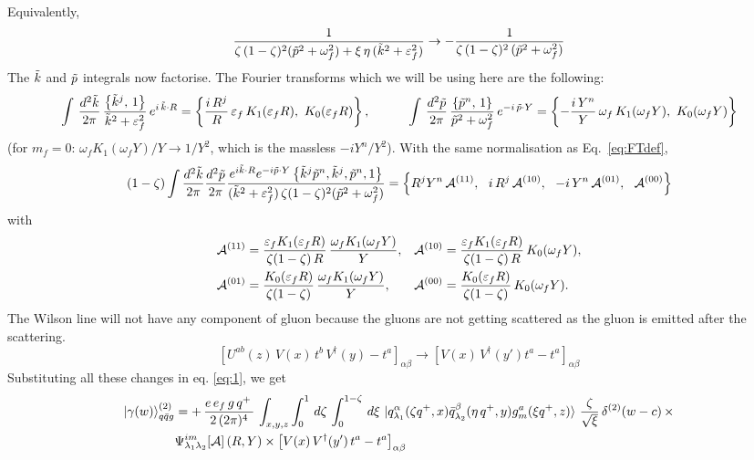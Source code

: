 \documentclass[9pt]{article}
\newcommand{\eps}{\varepsilon_{f}}           %
\newcommand{\om}{\omega_{f}}                 %
\newcommand{\Ga}[1]{\mathcal{A}^{(#1)}}      %
\numberwithin{equation}{section}
\begin{document}
\begin{enumerate}
Equivalently,
$$\frac{1}{\zeta\,(1-\zeta)^{2}(\Tilde{p}^{2}+\om^{2})+\xi\,\eta\, (\Tilde{k}^{2}+\eps^{2})}\rightarrow -\frac{1}{\zeta\,(1-\zeta)^{2}\,(\Tilde{p}^{2}+\om^{2})}$$
The $\Tilde{k}$ and $\Tilde{p}$ integrals now factorise. The Fourier transforms which we will be using here are the following:
$$\int\, \frac{d^{2}\Tilde{k}}{2\pi}\, \frac{\left\{\Tilde{k}^{j},\,1\right\}}{\Tilde{k}^{2}+\eps^{2}}\, e^{i\,\Tilde{k}\cdot R} = \left\{\frac{i\,R^{j}}{R}\,\eps\,K_{1}(\eps R),\ K_{0}(\eps R)\right\},\hspace{3em} \int\, \frac{d^{2}\Tilde{p}}{2\pi}\, \frac{\left\{\Tilde{p}^{n},\,1\right\}}{\Tilde{p}^{2}+\om^{2}}\, e^{-i\,\Tilde{p}\cdot Y} = \left\{-\frac{i\,Y^{n}}{Y}\,\om\,K_{1}(\om Y),\ K_{0}(\om Y)\right\}$$
(for $m_{f}=0$: $\om K_{1}(\om Y)/Y\rightarrow 1/Y^{2}$, which is the massless $-iY^{n}/Y^{2}$). With the same normalisation as Eq.~\eqref{eq:FTdef},
$$(1-\zeta)\int\frac{d^{2}\Tilde{k}}{2\pi}\frac{d^{2}\Tilde{p}}{2\pi}\frac{e^{i\Tilde{k}\cdot R}e^{-i\Tilde{p}\cdot Y}\left\{\Tilde{k}^{j}\Tilde{p}^{n},\Tilde{k}^{j},\Tilde{p}^{n},1\right\}}{(\Tilde{k}^{2}+\eps^{2})\,\zeta(1-\zeta)^{2}(\Tilde{p}^{2}+\om^{2})} = \left\{R^{j}Y^{n}\,\Ga{11},\ \ i\,R^{j}\,\Ga{10},\ \ -i\,Y^{n}\,\Ga{01},\ \ \Ga{00}\right\}$$
with
\begin{align}\label{eq:Adef}
    \Ga{11} & = \frac{\eps K_{1}(\eps R)}{\zeta(1-\zeta)\,R}\,\frac{\om K_{1}(\om Y)}{Y}, & \Ga{10} & = \frac{\eps K_{1}(\eps R)}{\zeta(1-\zeta)\,R}\,K_{0}(\om Y), \notag \\
    \Ga{01} & = \frac{K_{0}(\eps R)}{\zeta(1-\zeta)}\,\frac{\om K_{1}(\om Y)}{Y}, & \Ga{00} & = \frac{K_{0}(\eps R)}{\zeta(1-\zeta)}\,K_{0}(\om Y).
\end{align}
The Wilson line will not have any component of gluon because the gluons are not getting scattered as the gluon is emitted after the scattering.
$$\left[U^{ab}(z)\,V(x)\,t^{b}\,V^{\dagger}(y)-t^{a}\right]_{\alpha\beta}\rightarrow \left[V(x)\,V^{\dagger}(y')t^{a}-t^{a}\right]_{\alpha\beta} $$
Substituting all these changes in eq. \eqref{eq:1}, we get
\begin{align} \label{eq:2}
     \ket{\gamma(w)}^{(2)}_{q\Bar{q}g} & = +\,\frac{e\,e_{f}\,g\,q^{+}\,}{2\,(2\pi)^{4}}\, \int_{x,y,z} \int_{0}^{1}\, d\zeta\, \int_{0}^{1-\zeta}\, d\xi\,\ket{q^{\alpha}_{\lambda_{1}}(\zeta q^{+},x)\Bar{q}^{\beta}_{\lambda_{2}}(\eta\,q^{+},y)g^{a}_{m}(\xi q^{+},z)}\, \frac{\zeta}{\sqrt{\xi}}\, \delta^{(2)}(w-c)\,\times \notag \\ & \Psi^{im}_{\lambda_{1}\lambda_{2}}\!\left[\mathcal{A}\right](R,Y)\times \left[V(x)\,V^{\dagger}(y')\,t^{a}-t^{a}\right]_{\alpha\beta}

\end{align}
\end{enumerate}
\end{document}
